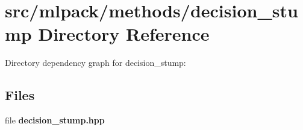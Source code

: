 \section{src/mlpack/methods/decision\-\_\-stump Directory Reference}
\label{dir_2360f797b3921b1bd11aded252e1cdd9}
Directory dependency graph for decision\-\_\-stump\-:
\subsection*{Files}
\begin{DoxyCompactItemize}
\item 
file {\bf decision\-\_\-stump.\-hpp}
\end{DoxyCompactItemize}
